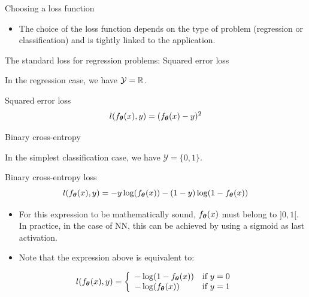 \documentclass[xcolor=pdftex,dvipsnames,table,mathserif,aspectratio=169]{beamer}
\begin{document}
\begin{frame}{Choosing a loss function}

\begin{itemize}
\item The choice of the loss function depends on the type of problem (regression or classification) and is tightly linked to the application.
\end{itemize}

\end{frame}


\begin{frame}{The standard loss for regression problems: Squared error loss}

In the regression case, we have $\mathcal{Y} = \mathbb{R}$.

\begin{block}{Squared error loss}
    \[
    l(f_{\boldsymbol{\theta}}(x), y) = (f_{\boldsymbol{\theta}}(x) - y)^2
    \]

\end{block}

\end{frame}


\begin{frame}{Binary cross-entropy}

  In the simplest classification case, we have $\mathcal{Y}=\{0, 1\}$.

  \begin{block}{Binary cross-entropy loss}
    \[
    l(f_{\boldsymbol{\theta}}(x), y) = - y \log(f_{\boldsymbol{\theta}}(x)) - (1 - y) \log(1 - f_{\boldsymbol{\theta}}(x))
    \]
  \end{block}

\begin{itemize}
\item   For this expression to be mathematically sound, $f_{\boldsymbol{\theta}}(x)$ must belong to $]0, 1[$. In practice, in the case of NN, this can be achieved by using a sigmoid as last activation.
  \item Note that the expression above is equivalent to:
\end{itemize}

$$
l(f_{\boldsymbol{\theta}}(x), y) = \left\{
    \begin{array}{ll}
        - \log(1 - f_{\boldsymbol{\theta}}(x)) & \mbox{if } y=0 \\
        - \log(f_{\boldsymbol{\theta}}(x)) & \mbox{if } y=1
    \end{array}
\right.
$$


\end{frame}
\end{document}
